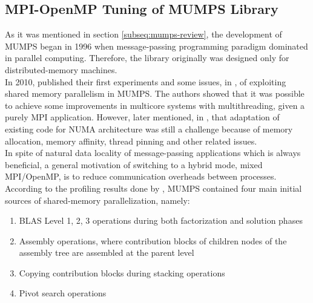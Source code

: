 \subsection{MPI-OpenMP Tuning of MUMPS Library}
\label{subseq:mpi-openmp}


As it was mentioned in  section \ref{subseq:mumps-review}, the development of MUMPS began in 1996 when message-passing programming paradigm dominated in parallel computing. Therefore, the library originally was designed only for distributed-memory machines.\\

In 2010,  \citeauthor{chowdhury2010some} published their first experiments and some issues, in \cite{chowdhury2010some}, of exploiting shared memory parallelism in MUMPS. The authors showed that it was possible to achieve some improvements in multicore systems with multithreading, given a purely MPI application. However, later \citeauthor{l2013introduction} mentioned, in \cite{l2013introduction}, that adaptation of existing code for NUMA architecture was still a challenge because of memory allocation, memory affinity, thread pinning and other related issues.\\


In spite of natural data locality of message-passing applications which is always beneficial, a general motivation of switching to a hybrid mode, mixed MPI/OpenMP, is to reduce communication overheads between processes. According to the profiling results done by \citeauthor{chowdhury2010some}, MUMPS contained four main initial sources of shared-memory parallelization, namely: 

\begin{enumerate}

	\item BLAS Level 1, 2, 3 operations during both factorization and solution phases \label{openmp-blocks-1}
	
	\item Assembly operations, where contribution blocks of children nodes of the assembly tree are assembled at the parent level \label{openmp-blocks-2}
	
	\item Copying contribution blocks during stacking operations \label{openmp-blocks-3}
	
	\item Pivot search operations \label{openmp-blocks-4}

\end{enumerate}


